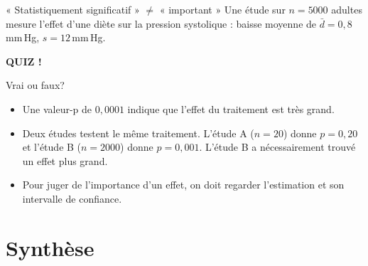 \documentclass{BeamerTemplate}
\begin{document}
\begin{frame}[t]{« Statistiquement significatif » $\ne$ « important »}
  Une étude sur $n = 5000$ adultes mesure l'effet d'une diète sur la pression systolique : baisse moyenne de $\bar{d} = 0{,}8$\,mm\,Hg, $s = 12$\,mm\,Hg.



  \vspace{-2mm}
\end{frame}

\begin{frame}[plain,t]
  \centerline{\LARGE\bfseries\alert{QUIZ !}}

  \medskip
  Vrai ou faux?
  \begin{itemize}\itemsep 1.2cm
    \item Une valeur-p de $0{,}0001$ indique que l'effet du traitement est très grand.
    \item<2-> Deux études testent le même traitement. L'étude A ($n = 20$) donne $p = 0{,}20$ et l'étude B ($n = 2000$) donne $p = 0{,}001$. L'étude B a nécessairement trouvé un effet plus grand.
    \item<3-> Pour juger de l'importance d'un effet, on doit regarder l'estimation et son intervalle de confiance.
  \end{itemize}
\end{frame}

\section{Synthèse}
\end{document}
